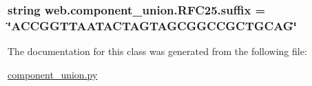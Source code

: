 \hypertarget{classweb_1_1component__union_1_1_r_f_c25_aa03490fe92d2f1fcd5d2e80ff4e7f0ef}{
\subsubsection[{suffix}]{\setlength{\rightskip}{0pt plus 5cm}string web.\-component\-\_\-union.\-R\-F\-C25.\-suffix = \char`\"{}A\-C\-C\-G\-G\-T\-T\-A\-A\-T\-A\-C\-T\-A\-G\-T\-A\-G\-C\-G\-G\-C\-C\-G\-C\-T\-G\-C\-A\-G\char`\"{}\hspace{0.3cm}{\ttfamily [static]}}}\label{classweb_1_1component__union_1_1_r_f_c25_aa03490fe92d2f1fcd5d2e80ff4e7f0ef}


The documentation for this class was generated from the following file\-:\begin{DoxyCompactItemize}
\item 
\hyperlink{component__union_8py}{component\-\_\-union.\-py}\end{DoxyCompactItemize}
